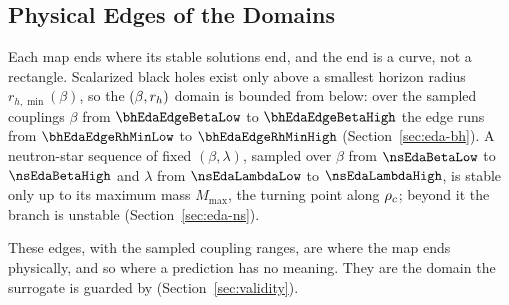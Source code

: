 \subsection{Physical Edges of the Domains}
\label{sec:domain-boundaries}

Each map ends where its stable solutions end, and the end is a curve, not a rectangle. Scalarized black holes exist only above a smallest horizon radius $r_{h,\min}(\beta)$, so the $(\beta, r_h)$ domain is bounded from below: over the sampled couplings $\beta$ from $\bhEdaEdgeBetaLow$ to $\bhEdaEdgeBetaHigh$ the edge runs from $\bhEdaEdgeRhMinLow$ to $\bhEdaEdgeRhMinHigh$ (Section~\ref{sec:eda-bh}). A neutron-star sequence of fixed $(\beta, \lambda)$, sampled over $\beta$ from $\nsEdaBetaLow$ to $\nsEdaBetaHigh$ and $\lambda$ from $\nsEdaLambdaLow$ to $\nsEdaLambdaHigh$, is stable only up to its maximum mass $M_{\max}$, the turning point along $\rho_c$; beyond it the branch is unstable (Section~\ref{sec:eda-ns}).

These edges, with the sampled coupling ranges, are where the map ends physically, and so where a prediction has no meaning. They are the domain the surrogate is guarded by (Section~\ref{sec:validity}).
